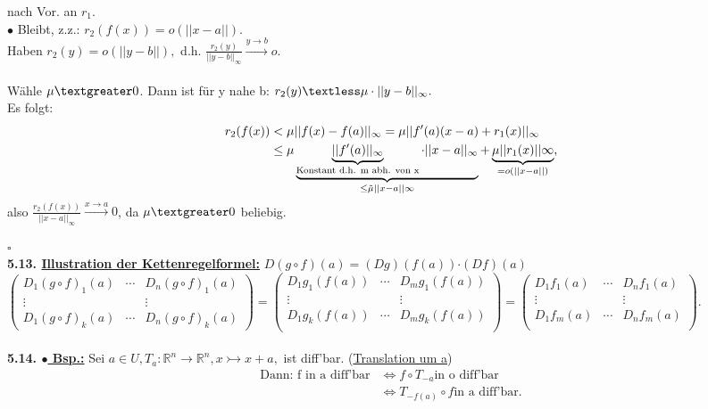 \documentclass[]{scrartcl}
\begin{document}
	nach Vor. an $r_1$.\\
	$\bullet$ Bleibt, z.z.: $r_2(f(x))=o(||x-a||).$\\
	Haben $r_2(y)=o(||y-b||),$ d.h. 
	$\frac{r_2(y)}{||y-b||_\infty}\xrightarrow{y\rightarrow b}o.$\\
	\\
	Wähle $\mu \textgreater 0$. Dann ist für y nahe b: $r_2(y)\textless 
	\mu\cdot||y-b||_\infty.$\\
	Es folgt: \begin{align}
		r_2(f(x))&\textless 
		\mu||f(x)-f(a)||_\infty=\mu||f'(a)(x-a)+r_1(x)||_\infty\\
		&\leq\mu \underbrace{\underbrace{||f'(a)||_\infty}_{\text{Konstant d.h. 
		m abh. von x}}\cdot||x-a||_\infty}_{\leq 
		\tilde{\mu}||x-a||\infty}+\underbrace{\mu||r_1(x)||\infty}_{=o(||x-a||)},
	\end{align}
	also $\frac{r_2 (f(x))}{||x-a||_\infty}\xrightarrow{x\rightarrow a}0$, da 
	$\mu \textgreater 0$ beliebig.\\
	\strut\hfill$\square$\\
	\textbf{5.13. \underline{Illustration der Kettenregelformel:}} $D(g\circ 
	f)(a)=$\ul{$(Dg)(f(a))$}$\cdot$\ul{$(Df)(a)$}\\
	$\begin{pmatrix}
		D_1(g\circ f)_1(a)&\cdots&D_n(g\circ f)_1(a)\\
		\vdots& &\vdots\\
		D_1(g\circ f)_k(a)&\cdots&D_n(g\circ f)_k(a)
	\end{pmatrix}=\begin{pmatrix}
	D_1g_1(f(a))&\cdots&D_mg_1(f(a))\\
	\vdots& &\vdots\\
	D_1g_k(f(a))&\cdots&D_mg_k(f(a))\\
	\end{pmatrix}=\begin{pmatrix}
		D_1f_1(a)&\cdots&D_nf_1(a)\\
		\vdots& &\vdots\\
		D_1f_m(a)&\cdots&D_nf_m(a)\\
	\end{pmatrix}.$\\
	\\
	\textbf{5.14. \underline{$\bullet$ Bsp.:}} Sei $a\in U, T_a: 
	\mathbb{R}^n\rightarrow\mathbb{R}^n, x\rightarrowtail x+a,$ ist diff'bar. 
	(\ul{Translation um a})\\
	\begin{align}
		\text{Dann: f in a diff'bar} &\Leftrightarrow f \circ T_{-a} \text{in o 
		diff'bar}\\
		&\Leftrightarrow T_{-f(a)} \circ f \text{in a diff'bar.}
	\end{align}
\end{document}
